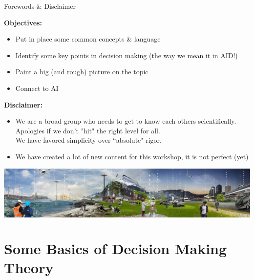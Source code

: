 \documentclass[lecture]{beamer}
\begin{document}
\begin{frame}{\normalsize Forewords \& Disclaimer}
\footnotesize

\textbf{Objectives:}
\begin{itemize}
\item Put in place some common concepts \& language
\item Identify some key points in decision making (the way we mean it in AID!)
\item Paint a big (and rough) picture on the topic
\item Connect to AI
\end{itemize}
\vspace{.25cm}
\textbf{Disclaimer:} 
\begin{itemize}
\item We are a broad group who needs to get to know each others scientifically. Apologies if we don't "hit" the right level for all. \\We have favored simplicity over ``absolute" rigor. 
\item We have created a lot of new content for this workshop, it is not perfect (yet)
\end{itemize}
\vspace{1cm}
\includegraphics[width=1\textwidth,clip]{Figures/SmartGridLab.eps}

\end{frame}

\section{Some Basics of Decision Making Theory}
\end{document}
